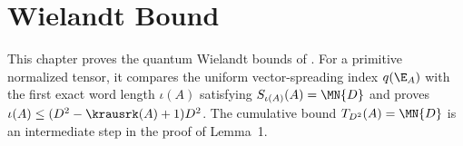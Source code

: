 \chapter{Wielandt Bound}\label{ch:wielandt}

This chapter proves the quantum Wielandt bounds of
\cite{Sanz2010Quantum}. For a primitive normalized tensor, it compares the
uniform vector-spreading index $q(\E_A)$ with the first exact word length
$\iota(A)$ satisfying $S_{\iota(A)}(A)=\MN{D}$ and proves
$\iota(A)\le(D^2-\krausrk(A)+1)D^2$. The cumulative bound
$T_{D^2}(A)=\MN{D}$ is an intermediate step in the proof of Lemma~1.



